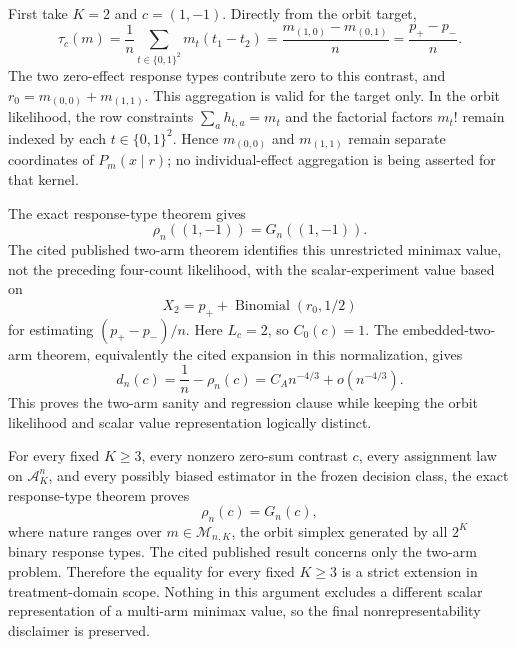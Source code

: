 First take \(K=2\) and \(c=(1,-1)\). Directly from the orbit target,
\[
\tau_c(m)
=\frac1n\sum_{t\in\{0,1\}^2}m_t(t_1-t_2)
=\frac{m_{(1,0)}-m_{(0,1)}}n
=\frac{p_+-p_-}{n}.
\]
The two zero-effect response types contribute zero to this contrast, and \(r_0=m_{(0,0)}+m_{(1,1)}\). This aggregation is valid for the target only. In the orbit likelihood, the row constraints \(\sum_a h_{t,a}=m_t\) and the factorial factors \(m_t!\) remain indexed by each \(t\in\{0,1\}^2\). Hence \(m_{(0,0)}\) and \(m_{(1,1)}\) remain separate coordinates of \(P_m(x\mid r)\); no individual-effect aggregation is being asserted for that kernel.

The exact response-type theorem gives
\[
\rho_n((1,-1))=G_n((1,-1)).
\]
The cited published two-arm theorem identifies this unrestricted minimax value, not the preceding four-count likelihood, with the scalar-experiment value based on
\[
X_2=p_++\operatorname{Binomial}(r_0,1/2)
\]
for estimating \((p_+-p_-)/n\). Here \(L_c=2\), so \(C_0(c)=1\). The embedded-two-arm theorem, equivalently the cited expansion in this normalization, gives
\[
d_n(c)=\frac1n-\rho_n(c)
=C_A n^{-4/3}+o(n^{-4/3}).
\]
This proves the two-arm sanity and regression clause while keeping the orbit likelihood and scalar value representation logically distinct.

For every fixed \(K\ge3\), every nonzero zero-sum contrast \(c\), every assignment law on \(\mathcal A_K^n\), and every possibly biased estimator in the frozen decision class, the exact response-type theorem proves
\[
\rho_n(c)=G_n(c),
\]
where nature ranges over \(m\in\mathcal M_{n,K}\), the orbit simplex generated by all \(2^K\) binary response types. The cited published result concerns only the two-arm problem. Therefore the equality for every fixed \(K\ge3\) is a strict extension in treatment-domain scope. Nothing in this argument excludes a different scalar representation of a multi-arm minimax value, so the final nonrepresentability disclaimer is preserved.